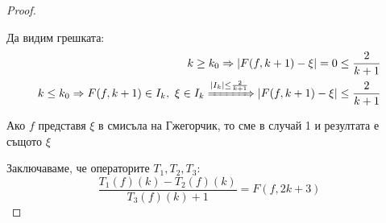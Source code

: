 \begin{proof}
\begin{itemize}
        Да видим грешката:
        \begin{equation}
            \begin{split}
                k \geq k_0 \Rightarrow \left|F(f, k+1) - \xi\right| = 0 \leq \frac{2}{k+1} \\
                k \leq k_0 \Rightarrow F(f, k+1) \in I_k,\ \xi \in I_k \xRightarrow{\ensuremath{\left|I_k\right|} \leq \frac{2}{k+1}} \left|F(f, k+1) - \xi\right| \leq \frac{2}{k+1}
            \end{split}
        \end{equation}
    \end{itemize}

    Ако $f$ представя $\xi$ в смисъла на Гжегорчик, то сме в случай 1 и резултата е същото $\xi$

    Заключаваме, че операторите $T_1, T_2, T_3$:
    \begin{equation}
        \frac{T_1(f)(k) - T_2(f)(k)}{T_3(f)(k) + 1} = F(f, 2k+3)
    \end{equation}
\end{proof}